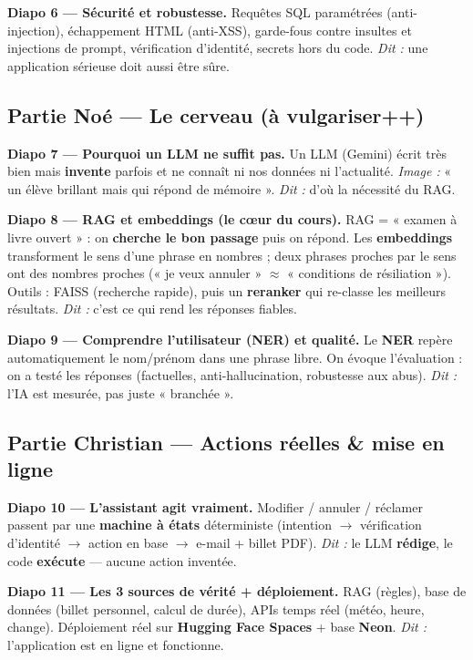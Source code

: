 \documentclass[11pt,a4paper]{article}
\begin{document}
\textbf{Diapo 6 --- Sécurité et robustesse.}
Requêtes SQL paramétrées (anti-injection), échappement HTML (anti-XSS), garde-fous
contre insultes et injections de prompt, vérification d'identité, secrets hors du code.
\emph{Dit :} une application sérieuse doit aussi être sûre.

\subsection*{Partie Noé --- Le cerveau (à vulgariser++)}

\textbf{Diapo 7 --- Pourquoi un LLM ne suffit pas.}
Un LLM (Gemini) écrit très bien mais \textbf{invente} parfois et ne connaît ni nos
données ni l'actualité. \emph{Image :} « un élève brillant mais qui répond de mémoire ».
\emph{Dit :} d'où la nécessité du RAG.

\textbf{Diapo 8 --- RAG et embeddings (le c\oe ur du cours).}
RAG = « examen à livre ouvert » : on \textbf{cherche le bon passage} puis on répond.
Les \textbf{embeddings} transforment le sens d'une phrase en nombres ; deux phrases
proches par le sens ont des nombres proches (« je veux annuler » $\approx$ « conditions
de résiliation »). Outils : FAISS (recherche rapide), puis un \textbf{reranker} qui
re-classe les meilleurs résultats. \emph{Dit :} c'est ce qui rend les réponses fiables.

\textbf{Diapo 9 --- Comprendre l'utilisateur (NER) et qualité.}
Le \textbf{NER} repère automatiquement le nom/prénom dans une phrase libre. On évoque
l'évaluation : on a testé les réponses (factuelles, anti-hallucination, robustesse aux
abus). \emph{Dit :} l'IA est mesurée, pas juste « branchée ».

\subsection*{Partie Christian --- Actions réelles \& mise en ligne}

\textbf{Diapo 10 --- L'assistant agit vraiment.}
Modifier / annuler / réclamer passent par une \textbf{machine à états} déterministe
(intention $\rightarrow$ vérification d'identité $\rightarrow$ action en base
$\rightarrow$ e-mail + billet PDF). \emph{Dit :} le LLM \textbf{rédige}, le code
\textbf{exécute} --- aucune action inventée.

\textbf{Diapo 11 --- Les 3 sources de vérité + déploiement.}
RAG (règles), base de données (billet personnel, calcul de durée), APIs temps réel
(météo, heure, change). Déploiement réel sur \textbf{Hugging Face Spaces} + base
\textbf{Neon}. \emph{Dit :} l'application est en ligne et fonctionne.
\end{document}
